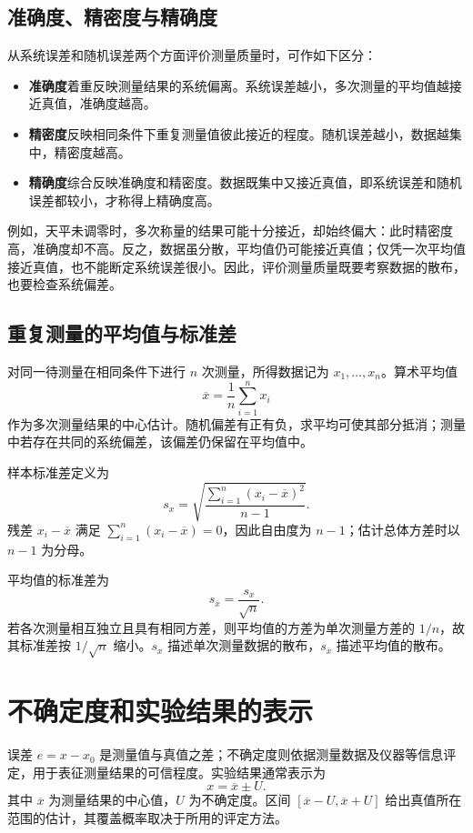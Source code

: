 \documentclass[UTF8, fontset=fandol, a4paper, 12pt]{ctexart}
\theoremstyle{definition}
\newcommand{\meanx}{\overline{x}}
\begin{document}
\subsection*{准确度、精密度与精确度}

从系统误差和随机误差两个方面评价测量质量时，可作如下区分：
\begin{itemize}
  \item \textbf{准确度}着重反映测量结果的系统偏离。系统误差越小，多次测量的平均值越接近真值，准确度越高。
  \item \textbf{精密度}反映相同条件下重复测量值彼此接近的程度。随机误差越小，数据越集中，精密度越高。
  \item \textbf{精确度}综合反映准确度和精密度。数据既集中又接近真值，即系统误差和随机误差都较小，才称得上精确度高。
\end{itemize}

例如，天平未调零时，多次称量的结果可能十分接近，却始终偏大：此时精密度高，准确度却不高。反之，数据虽分散，平均值仍可能接近真值；仅凭一次平均值接近真值，也不能断定系统误差很小。因此，评价测量质量既要考察数据的散布，也要检查系统偏差。

\subsection*{重复测量的平均值与标准差}

对同一待测量在相同条件下进行 $n$ 次测量，所得数据记为 $x_1,\ldots,x_n$。算术平均值
\[
  \meanx=\frac1n\sum_{i=1}^n x_i
\]
作为多次测量结果的中心估计。随机偏差有正有负，求平均可使其部分抵消；测量中若存在共同的系统偏差，该偏差仍保留在平均值中。

样本标准差定义为
\[
  s_x=\sqrt{\frac{\displaystyle\sum_{i=1}^n(x_i-\meanx)^2}{n-1}}.
\]
残差 $x_i-\meanx$ 满足 $\sum_{i=1}^n(x_i-\meanx)=0$，因此自由度为 $n-1$；估计总体方差时以 $n-1$ 为分母。

平均值的标准差为
\[
  s_{\meanx}=\frac{s_x}{\sqrt n}.
\]
若各次测量相互独立且具有相同方差，则平均值的方差为单次测量方差的 $1/n$，故其标准差按 $1/\sqrt n$ 缩小。$s_x$ 描述单次测量数据的散布，$s_{\meanx}$ 描述平均值的散布。

\section{不确定度和实验结果的表示}

误差 $e=x-x_0$ 是测量值与真值之差；不确定度则依据测量数据及仪器等信息评定，用于表征测量结果的可信程度。实验结果通常表示为
\[
  x=\meanx\pm U.
\]
其中 $\meanx$ 为测量结果的中心值，$U$ 为不确定度。区间 $[\meanx-U,\meanx+U]$ 给出真值所在范围的估计，其覆盖概率取决于所用的评定方法。
\end{document}
